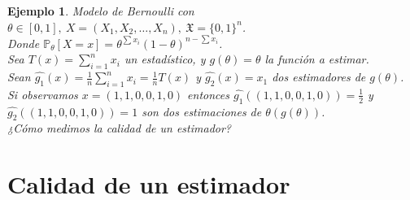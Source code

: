 \documentclass[10pt]{article}
\theoremstyle{plain}
\newtheorem{ej}{Ejemplo}
\theoremstyle{definition}
\begin{document}
\begin{ej} Modelo de Bernoulli con $\theta \in \left[0,1\right],\ X = (X_{1}, X_{2}, \ldots, X_{n}),\ \mathfrak{X} = \{0,1\}^n$.\\
Donde $\mathbb{P}_{\theta}\left[X=x\right] = \theta^{\sum{x_{i}}}(1-\theta)^{n-\sum{x_{i}}}$.\\
Sea $T(x) = \sum_{i=1}^n{x_{i}}$ un estadístico, y $g(\theta) = \theta$ la función a estimar.\\

Sean $\hat{g_{1}}(x) = \frac{1}{n}\sum_{i=1}^n{x_{i}} = \frac{1}{n}T(x)$ y $\hat{g_{2}}(x) = x_{1}$ dos estimadores de $g(\theta)$.\\
Si observamos $x=(1,1,0,0,1,0)$ entonces $\hat{g_{1}}((1,1,0,0,1,0)) = \frac{1}{2}$ y $\hat{g_{2}}((1,1,0,0,1,0)) = 1$ son dos estimaciones de $\theta (g(\theta))$.\\
¿Cómo medimos la calidad de un estimador?

\section{Calidad de un estimador}

\end{ej}
\end{document}
